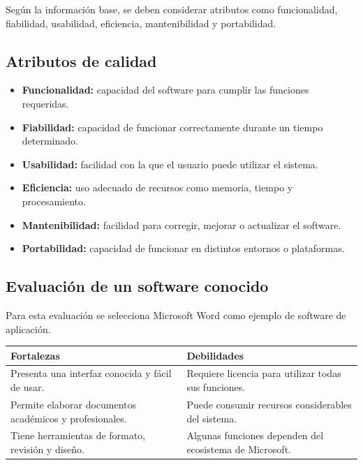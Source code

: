 \documentclass[12pt,a4paper]{article}
\begin{document}
	Según la información base, se deben considerar atributos como funcionalidad, fiabilidad, usabilidad, eficiencia, mantenibilidad y portabilidad.
	
	\subsection{Atributos de calidad}
	
	\begin{itemize}
		\item \textbf{Funcionalidad:} capacidad del software para cumplir las funciones requeridas.
		\item \textbf{Fiabilidad:} capacidad de funcionar correctamente durante un tiempo determinado.
		\item \textbf{Usabilidad:} facilidad con la que el usuario puede utilizar el sistema.
		\item \textbf{Eficiencia:} uso adecuado de recursos como memoria, tiempo y procesamiento.
		\item \textbf{Mantenibilidad:} facilidad para corregir, mejorar o actualizar el software.
		\item \textbf{Portabilidad:} capacidad de funcionar en distintos entornos o plataformas.
	\end{itemize}
	
	\subsection{Evaluación de un software conocido}
	
	Para esta evaluación se selecciona Microsoft Word como ejemplo de software de aplicación.
	
	\begin{longtable}{|p{6cm}|p{7cm}|}
		\hline
		\textbf{Fortalezas} & \textbf{Debilidades} \\
		\hline
		Presenta una interfaz conocida y fácil de usar. & Requiere licencia para utilizar todas sus funciones. \\
		\hline
		Permite elaborar documentos académicos y profesionales. & Puede consumir recursos considerables del sistema. \\
		\hline
		Tiene herramientas de formato, revisión y diseño. & Algunas funciones dependen del ecosistema de Microsoft. \\
		\hline
	\end{longtable}
	
\end{document}
